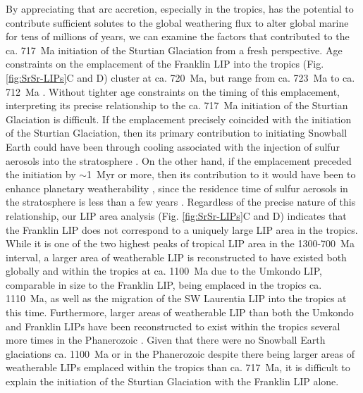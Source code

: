By appreciating that arc accretion, especially in the tropics, has the potential to contribute sufficient solutes to the global weathering flux to alter global marine \SrSr for tens of millions of years, we can examine the factors that contributed to the ca. 717~Ma initiation of the Sturtian Glaciation from a fresh perspective. Age constraints on the emplacement of the Franklin LIP into the tropics (Fig. \ref{fig:SrSr-LIPs}C and D) cluster at ca. 720~Ma, but range from ca. 723~Ma to ca. 712~Ma \citep{Heaman1992a, Pehrsson1999a, Denyszyn2009a}. Without tighter age constraints on the timing of this emplacement, interpreting its precise relationship to the ca. 717~Ma initiation of the Sturtian Glaciation is difficult. If the emplacement precisely coincided with the initiation of the Sturtian Glaciation, then its primary contribution to initiating Snowball Earth could have been through cooling associated with the injection of sulfur aerosols into the stratosphere \citep{Macdonald2017a}. On the other hand, if the emplacement preceded the initiation by $\sim$1~Myr or more, then its contribution to it would have been to enhance planetary weatherability \citep{Godderis2003a, Rooney2014a, Cox2016a}, since the residence time of sulfur aerosols in the stratosphere is less than a few years \citep{McCormick1995a}. Regardless of the precise nature of this relationship, our LIP area analysis (Fig. \ref{fig:SrSr-LIPs}C and D) indicates that the Franklin LIP does not correspond to a uniquely large LIP area in the tropics. While it is one of the two highest peaks of tropical LIP area in the 1300-700~Ma interval, a larger area of weatherable LIP is reconstructed to have existed both globally and within the tropics at ca. 1100~Ma due to the Umkondo LIP, comparable in size to the Franklin LIP, being emplaced in the tropics ca. 1110~Ma, as well as the migration of the SW Laurentia LIP into the tropics at this time. Furthermore, larger areas of weatherable LIP than both the Umkondo and Franklin LIPs have been reconstructed to exist within the tropics several more times in the Phanerozoic \citep{Park2019a}. Given that there were no Snowball Earth glaciations ca. 1100~Ma or in the Phanerozoic despite there being larger areas of weatherable LIPs emplaced within the tropics than ca. 717~Ma, it is difficult to explain the initiation of the Sturtian Glaciation with the Franklin LIP alone.

